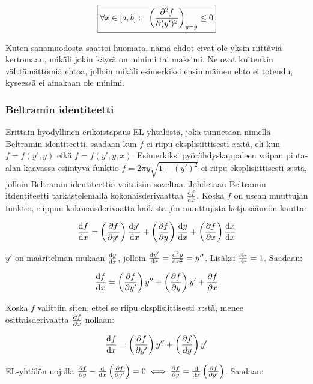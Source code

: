 \documentclass[../johdoksia.tex]{subfiles}
\begin{document}
	\begin{equation}
		\boxed{\forall x \in[a,b]: \ \ \left(\pdv{^2f}{(y')^2}\right)_{y=\tilde{y}} \leq 0}
	\end{equation}

	Kuten sanamuodosta saattoi huomata, nämä ehdot eivät ole yksin riittäviä kertomaan, mikäli jokin käyrä on minimi tai maksimi. Ne ovat kuitenkin välttämättömiä ehtoa, jolloin mikäli esimerkiksi ensimmäinen ehto ei toteudu, kyseessä ei ainakaan ole minimi.
	
	\subsubsection{Beltramin identiteetti}
	
	Erittäin hyödyllinen erikoistapaus EL-yhtälöstä, joka tunnetaan nimellä Beltramin identiteetti, saadaan kun $f$ ei riipu eksplisiittisesti $x$:stä, eli kun $f = f(y', y)$ eikä $f = f(y', y, x)$. Esimerkiksi pyörähdyskappaleen vaipan pinta-alan kaavassa esiintyvä funktio $f = 2\pi y\sqrt{1 + (y')^2}$ ei riipu eksplisiittisesti $x$:stä, jolloin Beltramin identiteettiä voitaisiin soveltaa. Johdetaan Beltramin itdentiteetti tarkastelemalla kokonaisderivaattaa $\odv{f}{x}$. Koska $f$ on usean muuttujan funktio, riippuu kokonaisderivaatta kaikista $f$:n muuttujista ketjusäännön kautta: 
	
	\begin{equation*}
		\odv{f}{x} = \left(\pdv{f}{y'}\right)\odv{y'}{x} + \left(\pdv{f}{y}\right)\odv{y}{x} + \left(\pdv{f}{x}\right)\odv{x}{x}
	\end{equation*}

	$y'$ on määritelmän mukaan $\odv{y}{x}$, jolloin $\odv{y'}{x} = \odv{^2y}{x^2} = y''$. Lisäksi $\odv{x}{x} = 1$. Saadaan:
	
	\begin{equation*}
		\odv{f}{x} = \left(\pdv{f}{y'}\right)y'' + \left(\pdv{f}{y}\right)y' + \pdv{f}{x}
	\end{equation*}

	Koska $f$ valittiin siten, ettei se riipu eksplisiittisesti $x$:stä, menee osittaisderivaatta $\pdv{f}{x}$ nollaan:
	
	\begin{equation*}
		\odv{f}{x} = \left(\pdv{f}{y'}\right)y'' + \left(\pdv{f}{y}\right)y'
	\end{equation*}

	EL-yhtälön nojalla $\pdv{f}{y} - \odv{}{x}\left(\pdv{f}{y'}\right) = 0 \iff \pdv{f}{y} = \odv{}{x}\left(\pdv{f}{y'}\right)$. Saadaan:
	
\end{document}
